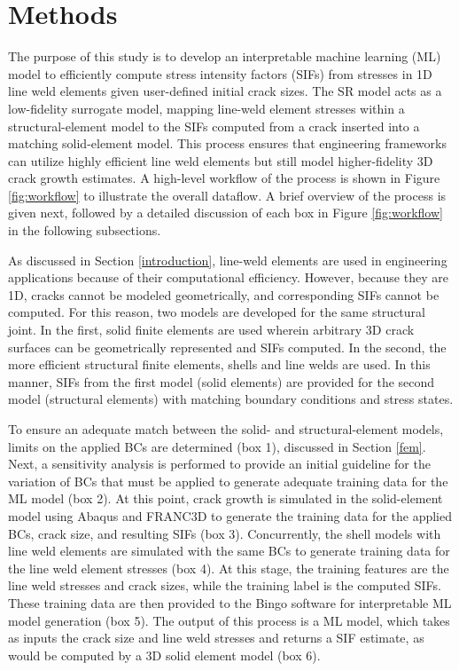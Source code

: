 
\chapter{Methods}\label{methods}

The purpose of this study is to develop an interpretable machine learning (ML)
model to efficiently compute stress intensity factors (SIFs) from stresses in
1D line weld elements given user-defined initial crack sizes.  The SR model acts
as a low-fidelity surrogate model, mapping line-weld element stresses within a
structural-element model to the SIFs computed from a crack inserted into a
matching solid-element model. This process ensures that engineering
frameworks can utilize highly efficient line weld elements but
still model higher-fidelity 3D crack growth estimates.  A high-level workflow of
the process is shown in Figure \ref{fig:workflow} to illustrate the overall
dataflow. A brief overview of the process is given next, followed by a detailed
discussion of each box in Figure \ref{fig:workflow} in the following
subsections.

As discussed in Section \ref{introduction}, line-weld elements are used in
engineering applications because of their computational efficiency.  However,
because they are 1D, cracks cannot be modeled geometrically, and corresponding
SIFs cannot be computed. For this reason, two models are developed for the same
structural joint. In the first, solid finite elements are used wherein
arbitrary 3D crack surfaces can be geometrically represented and SIFs computed.
In the second, the more efficient structural finite elements, shells and line
welds are used. In this manner, SIFs from the first model (solid elements)
are provided for the second model (structural elements) with matching boundary
conditions and stress states.  

To ensure an adequate match between the solid- and structural-element models,
limits on the applied BCs are determined (box 1), discussed in Section
\ref{fem}.  Next, a sensitivity analysis is performed to provide an initial
guideline for the variation of BCs that must be applied to generate adequate
training data for the ML model (box 2).  At this point, crack growth is
simulated in the solid-element model using Abaqus and FRANC3D to generate the training
data for the applied BCs, crack size, and resulting SIFs (box 3).  Concurrently,
the shell models with line weld elements are simulated with the same BCs to
generate training data for the line weld element stresses (box 4).  At this
stage, the training features are the line weld stresses and crack sizes, while
the training label is the computed SIFs.  These training data are then provided
to the Bingo software for interpretable ML model generation (box 5).  The output
of this process is a ML model, which takes as inputs the crack size and line weld
stresses and returns a SIF estimate, as would be computed by a 3D solid element
model (box 6).  

